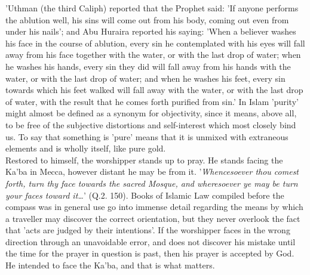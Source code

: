 \documentclass[10pt, twoside]{book}
\begin{document}
'Uthman (the third Caliph) reported that the Prophet said: 'If anyone performs the ablution well, his 
sins will come out from his body, coming out even from under his nails'; and Abu Huraira reported his 
saying: 'When a believer washes his face in the course of ablution, every sin he contemplated with 
his eyes will fall away from his face together with the water, or with the last drop of water; when 
he washes his hands, every sin they did will fall away from his hands with the water, or with the 
last drop of water; and when he washes his feet, every sin towards which his feet walked will fall 
away with the water, or with the last drop of water, with the result that he comes forth purified 
from sin.' In Islam 'purity' might almost be defined as a synonym for objectivity, since it means, 
above all, to be free of the subjective distortions and self-interest which most closely bind us. To 
say that something is 'pure' means that it is unmixed with extraneous elements and is wholly itself, 
like pure gold. \\

Restored to himself, the worshipper stands up to pray. He stands facing the Ka'ba in Mecca, however 
distant he may be from it. '\emph{Whencesoever thou comest forth, turn thy face towards the sacred Mosque, 
and wheresoever ye may be turn your faces toward it\ldots{}}' (Q.2. 150). Books of Islamic Law compiled 
before the compass was in general use go into immense detail regarding the means by which a traveller 
may discover the correct orientation, but they never overlook the fact that 'acts are judged by their 
intentions'. If the worshipper faces in the wrong direction through an unavoidable error, and does 
not discover his mistake until the time for the prayer in question is past, then his prayer is 
accepted by God. He intended to face the Ka'ba, and that is what matters. \\
\end{document}
